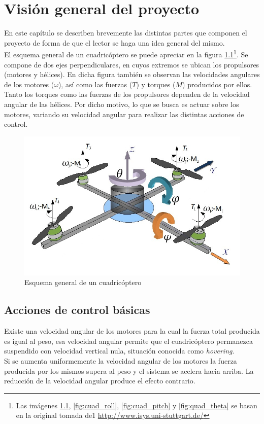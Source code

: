\documentclass[main]{subfiles}
\begin{document}
\chapter{Visi\'on general del proyecto}
\label{chap:general}
En este cap\'itulo se describen brevemente las distintas partes que componen el proyecto de forma de que el lector se haga una idea general del mismo.\\

El esquema general de un cuadric\'optero se puede apreciar en la figura \ref{fig:cuad}\footnote{Las imágenes \ref{fig:cuad}, \ref{fig:cuad_roll}, \ref{fig:cuad_pitch} y \ref{fig:quad_theta} se basan en la original tomada de1 \url{http://www.isys.uni-stuttgart.de/}}. Se compone de dos ejes perpendiculares, en cuyos extremos se ubican los propulsores (motores y h\'elices). En dicha figura tambi\'en se observan las velocidades angulares de los motores ($\omega$), as\'i como las fuerzas ($T$) y torques ($M$) producidos por ellos. Tanto los torques como las fuerzas de los propulsores dependen de la velocidad angular de las h\'elices. Por dicho motivo, lo que se busca es actuar sobre los motores, variando su velocidad angular para realizar las distintas acciones de control.

\begin{figure}[h!]
\centering
\includegraphics[scale=0.4]{./pics_general/quad_hov.jpg}
\caption{Esquema general de un cuadric\'optero}
\label{fig:cuad}
\end{figure}
\section{Acciones de control b\'asicas}
Existe una velocidad angular de los motores para la cual la fuerza total producida es igual al peso, esa velocidad angular permite que el cuadric\'optero permanezca suspendido con velocidad vertical nula, situaci\'on conocida como \emph{hovering}.\\ Si se aumenta uniformemente la velocidad angular de los motores la fuerza producida por los mismos supera al peso y el sistema se acelera hacia arriba. La reducción de la velocidad angular produce el efecto contrario.\\
\end{document}
